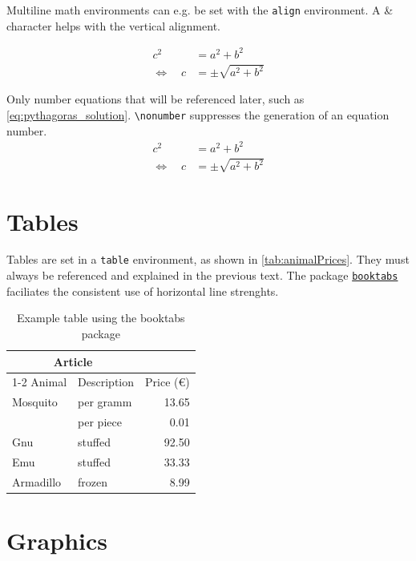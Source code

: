 Multiline math environments can e.g. be set with the \texttt{align} environment. A \& character helps with the vertical alignment.

\begin{align}
c^2 &= a^2 + b^2 \nonumber \\
\Leftrightarrow \quad c &= \pm \sqrt{a^2 + b^2} \label{eq:pythagoras_solution}
\end{align}


Only number equations that will be referenced later, such as \autoref{eq:pythagoras_solution}.
\texttt{\textbackslash nonumber} suppresses the generation of an equation number.
\begin{align}
c^2 &= a^2 + b^2 \\
\Leftrightarrow \quad c &= \pm \sqrt{a^2 + b^2} \label{eq:pythagoras_solution}
\end{align}


\section{Tables}

Tables are set in a \texttt{table} environment, as shown in \autoref{tab:animalPrices}.
They must always be referenced and explained in the previous text.
The package \href{https://ctan.kako-dev.de/macros/latex/contrib/booktabs/booktabs.pdf}{\texttt{booktabs}} faciliates the consistent use of horizontal line strenghts.

    \begin{table}[htb]
    \centering
    \begin{tabular}{@{}llr@{}} \toprule
    \multicolumn{2}{c}{Article}             \\ \cmidrule(r){1-2}
        Animal   & Description  & Price (€) \\ \midrule
        Mosquito & per gramm    & 13.65     \\
                 & per piece    & 0.01      \\
        Gnu      & stuffed      & 92.50     \\
        Emu      & stuffed      & 33.33     \\
        Armadillo& frozen       & 8.99      \\ \bottomrule
    \end{tabular}
    \caption{Example table using the booktabs package}
    \label{tab:animalPrices}
    \end{table}

\section{Graphics}

